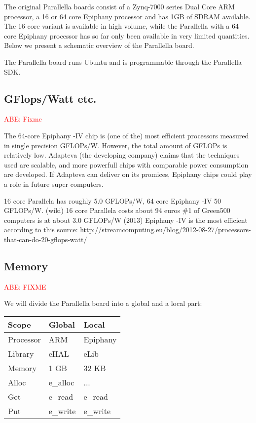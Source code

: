 \documentclass[fleqn]{article}
\renewcommand{\(}{\left(}
\renewcommand{\)}{\right)}
\newcommand{\todo}[1]{\textcolor{red}{#1}}
\def\tm{$^{\hbox{\tiny TM}}$~}
\renewcommand{\tm}{ }
\begin{document}
The original Parallella boards consist of a Zynq-7000 series Dual Core ARM processor, a 16 or 64 core Epiphany processor and has 1GB of SDRAM available. The 16 core variant is available in high volume, while the Parallella with a 64 core Epiphany processor has so far only been available in very limited quantities. Below we present a schematic overview of the Parallella board.



The Parallella board runs Ubuntu and is programmable through the Parallella SDK.

\subsection{GFlops/Watt etc.}

\todo{ABE: Fixme}

The 64-core Epiphany\tm-IV chip is (one of the) most efficient processors measured in single precision GFLOPs/W. However, the total amount of GFLOPs is relatively low. Adapteva (the developing company) claims that the techniques used are scalable, and more powerfull chips with comparable power consumption are developed. If Adapteva can deliver on its promices, Epiphany\tm chips could play a role in future super computers.

16 core Parallela has roughly 5.0 GFLOPs/W, 64 core Epiphany\tm-IV 50 GFLOPs/W. (wiki)
16 core Parallela costs about 94 euros
\#1 of Green500 computers is at about 3.0 GFLOPs/W (2013)
Epiphany\tm-IV is the most efficient according to this source:
http://streamcomputing.eu/blog/2012-08-27/processors-that-can-do-20-gflops-watt/

\subsection{Memory}

\todo{ABE: FIXME}

We will divide the Parallella board into a global and a local part:

\begin{tabular}{l|ll}
Scope & Global & Local \\
\hline
Processor & ARM & Epiphany\tm \\
Library & eHAL & eLib \\
Memory & 1 GB & 32 KB \\
Alloc & e\_alloc & ... \\
Get & e\_read & e\_read \\
Put & e\_write & e\_write \\

\end{tabular}
\end{document}
